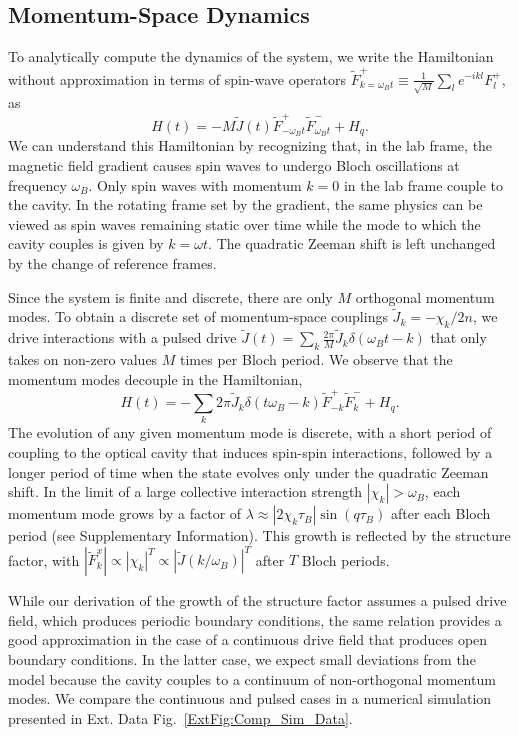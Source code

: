 \documentclass[aps,pra,twocolumn,superscriptaddress]{revtex4-1} %
\begin{document}
\begin{bibunit}
\subsection{Momentum-Space Dynamics}

To analytically compute the dynamics of the system, we write the Hamiltonian without approximation in terms of spin-wave operators $\tilde{F}^+_{k=\omega_B t} \equiv \frac{1}{\sqrt{M}}\sum_{l} e^{-ikl} {F}^+_l$, as
\begin{equation}
H(t) = -M \tilde{J}(t) \tilde{F}^+_{-\omega_B t} \tilde{F}^-_{\omega_B t} + H_q.
\end{equation}
We can understand this Hamiltonian by recognizing that, in the lab frame, the magnetic field gradient causes spin waves to undergo Bloch oscillations at frequency $\omega_B$. Only spin waves with momentum $k=0$ in the lab frame couple to the cavity. In the rotating frame set by the gradient, the same physics can be viewed as spin waves remaining static over time while the mode to which the cavity couples is given by $k=\omega t$. The quadratic Zeeman shift is left unchanged by the change of reference frames.

Since the system is finite and discrete, there are only $M$ orthogonal momentum modes. To obtain a discrete set of momentum-space couplings $\tilde{J}_k = -\chi_k/2n$, we drive interactions with a pulsed drive $\tilde{J}(t) = \sum_k \frac{2\pi}{M} \tilde{J}_k \delta(\omega_Bt-k)$ that only takes on non-zero values $M$ times per Bloch period. We observe that the momentum modes decouple in the Hamiltonian,
\begin{equation}
H(t) = -\sum_k 2\pi \tilde{J}_k \delta(t\omega_B-k) \tilde{F}^+_{-k} \tilde{F}^-_{k} + H_q.
\label{eq:PulsedH}
\end{equation}
The evolution of any given momentum mode is discrete, with a short period of coupling to the optical cavity that induces spin-spin interactions, followed by a longer period of time when the state evolves only under the quadratic Zeeman shift. In the limit of a large collective interaction strength $|\chi_k| > \omega_B$, each momentum mode grows by a factor of $\lambda \approx |2\chi_k \tau_B| \sin(q\tau_B)$ after each Bloch period (see Supplementary Information). This growth is reflected by the structure factor, with ${|\tilde{F}^x_{k}| \propto |\chi_k|^T \propto |\tilde{J}(k/\omega_B)|^T}$ after $T$ Bloch periods.

While our derivation of the growth of the structure factor assumes a pulsed drive field, which produces periodic boundary conditions, the same relation provides a good approximation in the case of a continuous drive field that produces open boundary conditions.  In the latter case, we expect small deviations from the model because the cavity couples to a continuum of non-orthogonal momentum modes.  We compare the continuous and pulsed cases in a numerical simulation presented in Ext. Data Fig.~\ref{ExtFig:Comp_Sim_Data}.


\end{bibunit}
\end{document}
